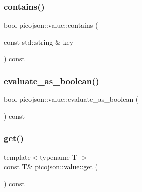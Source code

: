 \hypertarget{classpicojson_1_1value_a67fed7e1effed5c14fdb7f912f933842}{}\label{classpicojson_1_1value_a67fed7e1effed5c14fdb7f912f933842} 
\subsubsection{\texorpdfstring{contains()}{contains()}\hspace{0.1cm}{\footnotesize\ttfamily [2/2]}}
{\footnotesize\ttfamily bool picojson\+::value\+::contains (\begin{DoxyParamCaption}\item[{const std\+::string \&}]{key }\end{DoxyParamCaption}) const\hspace{0.3cm}{\ttfamily [inline]}}

\hypertarget{classpicojson_1_1value_a389873791af4898a52edc12b967a543f}{}\label{classpicojson_1_1value_a389873791af4898a52edc12b967a543f} 
\subsubsection{\texorpdfstring{evaluate\+\_\+as\+\_\+boolean()}{evaluate\_as\_boolean()}}
{\footnotesize\ttfamily bool picojson\+::value\+::evaluate\+\_\+as\+\_\+boolean (\begin{DoxyParamCaption}{ }\end{DoxyParamCaption}) const\hspace{0.3cm}{\ttfamily [inline]}}

\hypertarget{classpicojson_1_1value_a6a1099de1eb4f070445dc3eadb843a92}{}\label{classpicojson_1_1value_a6a1099de1eb4f070445dc3eadb843a92} 
\subsubsection{\texorpdfstring{get()}{get()}\hspace{0.1cm}{\footnotesize\ttfamily [1/6]}}
{\footnotesize\ttfamily template$<$typename T $>$ \\
const T\& picojson\+::value\+::get (\begin{DoxyParamCaption}{ }\end{DoxyParamCaption}) const}

